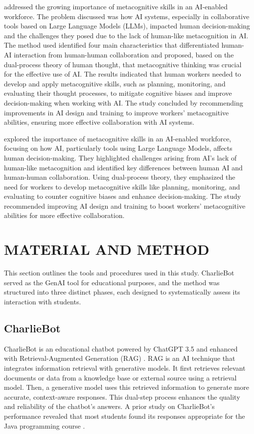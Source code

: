 \documentclass[sn-apa]{sn-jnl} %
\begin{document}
\cite{Sidra24} addressed the growing importance of metacognitive skills in an
AI-enabled workforce. The problem discussed was how AI systems, especially in
collaborative tools based on Large Language Models (LLMs), impacted human
decision-making and the challenges they posed due to the lack of human-like
metacognition in AI. The method used identified four main characteristics that
differentiated human-AI interaction from human-human collaboration and proposed,
based on the dual-process theory of human thought, that metacognitive thinking
was crucial for the effective use of AI. The results indicated that human
workers needed to develop and apply metacognitive skills, such as planning,
monitoring, and evaluating their thought processes, to mitigate cognitive biases
and improve decision-making when working with AI. The study concluded by
recommending improvements in AI design and training to improve workers'
metacognitive abilities, ensuring more effective collaboration with AI systems.

\cite{Sidra24} explored the importance of metacognitive skills in an AI-enabled
workforce, focusing on how AI, particularly tools using Large Language Models,
affects human decision-making. They highlighted challenges arising from AI's
lack of human-like metacognition and identified key differences between human
AI and human-human collaboration. Using dual-process theory, they emphasized the
need for workers to develop metacognitive skills like planning, monitoring, and
evaluating to counter cognitive biases and enhance decision-making. The study
recommended improving AI design and training to boost workers' metacognitive
abilities for more effective collaboration.

\section{\uppercase{Material and Method}}

This section outlines the tools and procedures used in this study. CharlieBot
served as the GenAI tool for educational purposes, and the method was structured
into three distinct phases, each designed to systematically assess its
interaction with students.

\subsection{CharlieBot}

CharlieBot is an educational chatbot powered by ChatGPT 3.5 and enhanced with
Retrieval-Augmented Generation (RAG) \citep{Sun24}. RAG is an AI technique that
integrates information retrieval with generative models. It first retrieves
relevant documents or data from a knowledge base or external source using a
retrieval model. Then, a generative model uses this retrieved information to
generate more accurate, context-aware responses. This dual-step process enhances
the quality and reliability of the chatbot's answers. A prior study on
CharlieBot's performance revealed that most students found its responses
appropriate for the Java programming course \citep{Hoyos24}.
\end{document}
